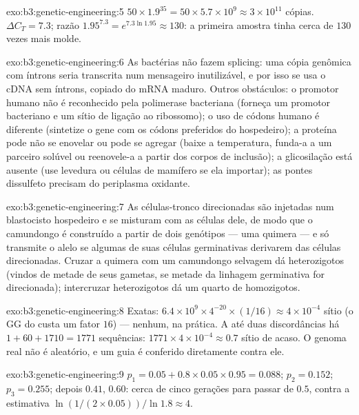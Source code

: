 \begin{solution}{exo:b3:genetic-engineering:5}
$50\times 1.9^{35} = 50\times 5.7\times 10^{9} \approx 3\times 10^{11}$
cópias. $\Delta C_{T} = 7.3$; razão $1.95^{7.3} = e^{7.3\ln 1.95}
\approx 130$: a primeira amostra tinha cerca de $130$ vezes mais molde.
\end{solution}

\begin{solution}{exo:b3:genetic-engineering:6}
As bactérias não fazem splicing: uma cópia genômica com íntrons seria
transcrita num mensageiro inutilizável, e por isso se usa o cDNA sem
íntrons, copiado do mRNA maduro. Outros obstáculos: o promotor humano
não é reconhecido pela polimerase bacteriana (forneça um promotor
bacteriano e um sítio de ligação ao ribossomo); o uso de códons humano
é diferente (sintetize o gene com os códons preferidos do hospedeiro);
a proteína pode não se enovelar ou pode se agregar (baixe a
temperatura, funda-a a um parceiro solúvel ou reenovele-a a partir dos
corpos de inclusão); a glicosilação está ausente (use levedura ou
células de mamífero se ela importar); as pontes dissulfeto precisam do
periplasma oxidante.
\end{solution}

\begin{solution}{exo:b3:genetic-engineering:7}
As células-tronco direcionadas são injetadas num blastocisto
hospedeiro e se misturam com as células dele, de modo que o camundongo
é construído a partir de dois genótipos --- uma quimera --- e só
transmite o alelo se algumas de suas células germinativas derivarem das
células direcionadas. Cruzar a quimera com um camundongo selvagem dá
heterozigotos (vindos de metade de seus gametas, se metade da linhagem
germinativa for direcionada); intercruzar heterozigotos dá um quarto de
 homozigotos.
\end{solution}

\begin{solution}{exo:b3:genetic-engineering:8}
Exatas: $6.4\times 10^{9}\times 4^{-20}\times (1/16) \approx 4\times
10^{-4}$ sítio (o GG do  custa um fator $16$) --- nenhum, na
prática. A até duas discordâncias há $1 + 60 + 1710 = 1771$ sequências:
$1771\times 4\times 10^{-4} \approx 0.7$ sítio de acaso. O genoma real
não é aleatório, e um guia é conferido diretamente contra ele.
\end{solution}

\begin{solution}{exo:b3:genetic-engineering:9}
$p_{1} = 0.05 + 0.8\times 0.05\times 0.95 = 0.088$; $p_{2} = 0.152$;
$p_{3} = 0.255$; depois $0.41$, $0.60$: cerca de cinco gerações para
passar de $0.5$, contra a estimativa
$\ln(1/(2\times 0.05))/\ln 1.8 \approx 4$.
\end{solution}

